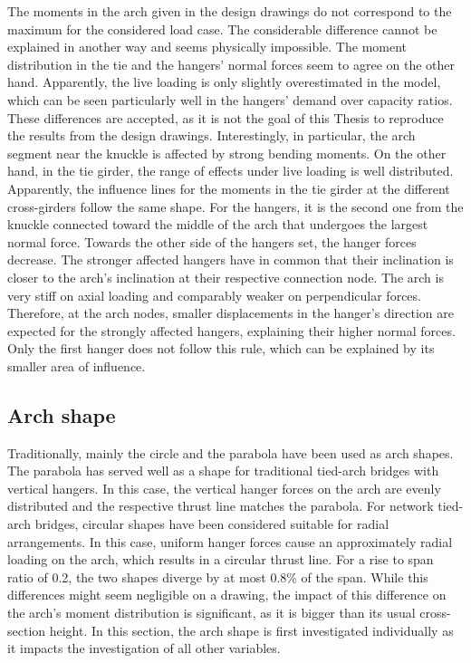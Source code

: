 The moments in the arch given in the design drawings do not correspond to the maximum for the considered load case. The considerable difference cannot be explained in another way and seems physically impossible. The moment distribution in the tie and the hangers' normal forces seem to agree on the other hand. Apparently, the live loading is only slightly overestimated in the model, which can be seen particularly well in the hangers' demand over capacity ratios. These differences are accepted, as it is not the goal of this Thesis to reproduce the results from the design drawings. Interestingly, in particular, the arch segment near the knuckle is affected by strong bending moments. On the other hand, in the tie girder, the range of effects under live loading is well distributed. Apparently, the influence lines for the moments in the tie girder at the different cross-girders follow the same shape. For the hangers, it is the second one from the knuckle connected toward the middle of the arch that undergoes the largest normal force. Towards the other side of the hangers set, the hanger forces decrease. The stronger affected hangers have in common that their inclination is closer to the arch's inclination at their respective connection node. The arch is very stiff on axial loading and comparably weaker on perpendicular forces. Therefore, at the arch nodes, smaller displacements in the hanger's direction are expected for the strongly affected hangers, explaining their higher normal forces. Only the first hanger does not follow this rule, which can be explained by its smaller area of influence. \medskip

\newpage
\subsection{Arch shape}
Traditionally, mainly the circle and the parabola have been used as arch shapes. The parabola has served well as a shape for traditional tied-arch bridges with vertical hangers. In this case, the vertical hanger forces on the arch are evenly distributed and the respective thrust line matches the parabola. For network tied-arch bridges, circular shapes have been considered suitable for radial arrangements. In this case, uniform hanger forces cause an approximately radial loading on the arch, which results in a circular thrust line. For a rise to span ratio of 0.2, the two shapes diverge by at most 0.8\% of the span. While this differences might seem negligible on a drawing, the impact of this difference on the arch's moment distribution is significant, as it is bigger than its usual cross-section height. In this section, the arch shape is first investigated individually as it impacts the investigation of all other variables. \medskip

